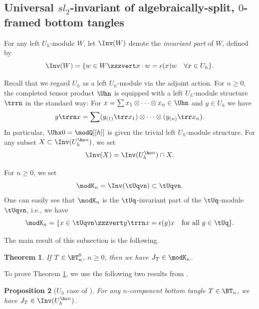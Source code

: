 \documentclass{amsart}
\numberwithin{equation}{section}
\numberwithin{figure}{section}
\theoremstyle{plain}
\newtheorem{theorem}{Theorem}[section]
\newtheorem{proposition}[theorem]{Proposition}
\theoremstyle{definition}
\theoremstyle{remark}
\begin{document}
\subsection{Universal $sl_2$-invariant of algebraically-split,
  $0$-framed bottom tangles}
\label{sec:invariant}

For any left $U_h$-module $W$, let $\Inv(W)$ denote the {\em invariant
  part} of $W$, defined by
\begin{equation*}
  \Inv(W) =\{w\in W\zzzvert  x\cdot w=\epsilon (x)w\quad \forall x\in U_h\}.
\end{equation*}

Recall that we regard $U_h$ as a left $U_h$-module via the adjoint
action.  For $n\ge 0$, the completed tensor product $\Uhn$ is equipped
with a left $U_h$-module structure $\trrn$ in the standard way: For
$x=\sum x_1\otimes \cdots\otimes x_n\in \Uhn$ and $y\in U_h$ we have
\begin{equation*}
  y\trrn x = \sum (y_{(1)}\trr x_1)\otimes \cdots\otimes (y_{(n)}\trr x_n).
\end{equation*}
In particular, $\Uhx0=\modQ [[h]]$ is given the trivial left $U_h$-module
structure.  For any subset $X\subset \Inv(U_h^{\ho n})$, we set
\begin{equation*}
  \Inv(X) = \Inv(U_h^{\ho n})\cap X.
\end{equation*}

For $n\ge 0$, we set
\begin{equation*}
  \modK _n= \Inv(\tUqvn)\subset \tUqvn.
\end{equation*}
One can easily see that $\modK _n$ is the $\tUq$-invariant part of the
$\tUq$-module $\tUqvn$, i.e., we have
\begin{equation*}
  \modK _n =\{x\in \tUqvn\zzzvert y\trrn x=\epsilon (y)x\quad \text{for all $y\in \tUq$}\}.
\end{equation*}

The main result of this subsection is the following.

\begin{theorem}
  \label{thm:8}
  If $T\in \BT^0_n$, $n\ge 0$, then we have $J_T\in \modK _n$.
\end{theorem}

To prove Theorem \ref{thm:8}, we use the following two results from
\cite{H:universal}.

\begin{proposition}[$U_h$ case of {\cite[Proposition 8.2]{H:universal}}]
  \label{r19}
  For any $n$-component bottom tangle $T\in \BT_n$, we have
  $J_T\in \Inv(U_h^{\ho n})$.
\end{proposition}
\end{document}

